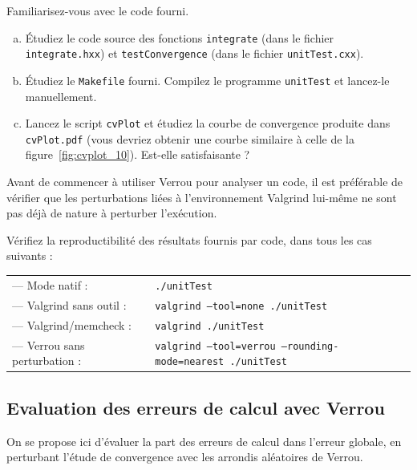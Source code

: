\documentclass[a4paper]{article}
\newcounter{Question}
\newenvironment{question}[1][\unskip]{
  \bigskip
  \stepcounter{Question}
  \def\questionTitle{ #1}
  \begin{mdframed}[style=question]
  }{
  \end{mdframed}
}
\begin{document}
\begin{question}
  Familiarisez-vous avec le code fourni.
  \begin{enumerate}[(a)]
  \item Étudiez le code source des fonctions \texttt{integrate} (dans le
    fichier \texttt{integrate.hxx}) et \texttt{testConvergence} (dans le fichier
    \texttt{unitTest.cxx}).
  \item Étudiez le \texttt{Makefile} fourni. Compilez le programme
    \texttt{unitTest} et lancez-le manuellement.
  \item Lancez le script \texttt{cvPlot} et étudiez la courbe de convergence
    produite dans \texttt{cvPlot.pdf} (vous devriez obtenir une courbe similaire
    à celle de la figure~\ref{fig:cvplot_10}). Est-elle satisfaisante ?
  \end{enumerate}
\end{question}

\bigskip

Avant de commencer à utiliser Verrou pour analyser un code, il est préférable de
vérifier que les perturbations liées à l'environnement Valgrind lui-même ne sont
pas déjà de nature à perturber l'exécution.

\begin{question}
  Vérifiez la reproductibilité des résultats fournis par code, dans tous les cas
  suivants :\\
  \begin{tabular}{ll}
    --- Mode natif :          & \tt ./unitTest\\
    --- Valgrind sans outil : & \tt valgrind --tool=none ./unitTest\\
    --- Valgrind/memcheck :   & \tt valgrind ./unitTest\\
    --- Verrou sans perturbation : & \tt valgrind --tool=verrou
                                     --rounding-mode=nearest ./unitTest
  \end{tabular}
\end{question}

\subsection{Evaluation des erreurs de calcul avec Verrou}

On se propose ici d'évaluer la part des erreurs de calcul dans l'erreur globale,
en perturbant l'étude de convergence avec les arrondis aléatoires de Verrou.
\end{document}
